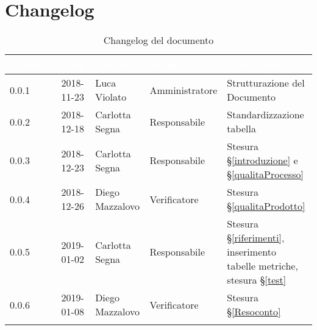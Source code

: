 \section{Changelog}

\begin{center}
\begin{longtable}[c]{|m{}|m{}|m{}|m{}|p{}|}
\hline
\rowcolor{bluelogo}\textbf{\textcolor{white}{Versione}} & \textbf{\textcolor{white}{Data}} & \textbf{\textcolor{white}{Autore}} & \textbf{\textcolor{white}{Ruolo}} & \textbf{\textcolor{white}{Descrizione}}\\
\hline \hline
\endfirsthead
0.0.1 & 2018-11-23 & Luca Violato & Amministratore & Strutturazione del Documento \\
\hline
\rowcolor{grigio} 0.0.2 & 2018-12-18 & Carlotta Segna & Responsabile & Standardizzazione tabella \\
\hline
0.0.3 & 2018-12-23 & Carlotta Segna & Responsabile & Stesura §\ref{introduzione} e §\ref{qualitaProcesso} \\
\hline
\rowcolor{grigio} 0.0.4 & 2018-12-26 & Diego Mazzalovo & Verificatore & Stesura §\ref{qualitaProdotto} \\
\hline
0.0.5 & 2019-01-02 & Carlotta Segna & Responsabile & Stesura §\ref{riferimenti}, inserimento tabelle metriche, stesura §\ref{test} \\
\hline
0.0.6 & 2019-01-08 & Diego Mazzalovo & Verificatore & Stesura §\ref{Resoconto}\\
\hline
\caption{Changelog del documento}
\end{longtable}
\end{center}